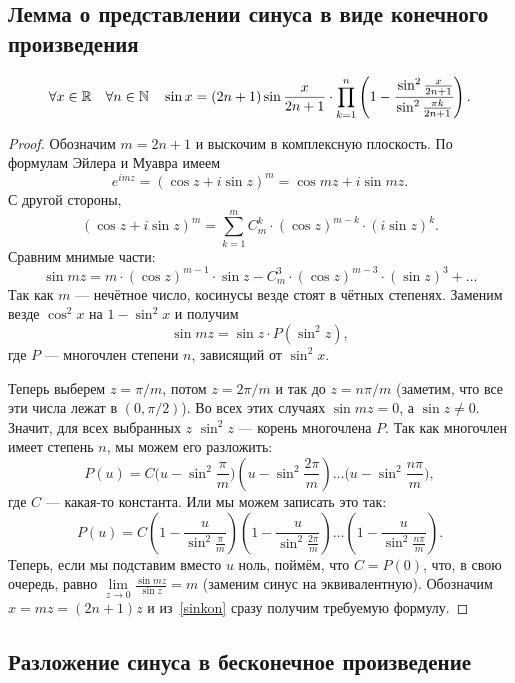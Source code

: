 \subsection{Лемма о представлении синуса в виде конечного произведения}

\begin{lemma} \hypertarget{sinlem}{}
	\[
		\forall x \in \mathbb{R} \quad \forall n \in \mathbb{N} \quad \sin x = (2n + 1) \sin \frac{x}{2n + 1} \cdot \prod_{k=1}^{n} \left(1 - \cfrac{\sin^2 \frac{x}{2n + 1}}{\sin^2 \frac{\pi k}{2n + 1}} \right).
	\]
\end{lemma}
\begin{proof}
	Обозначим \(m = 2n + 1\) и выскочим в комплексную плоскость. По формулам Эйлера и Муавра имеем \[
	e^{i m z} = (\cos z + i \sin z)^m = \cos mz + i \sin mz.
	\]
	С другой стороны, \[
	(\cos z + i \sin z)^m = \sum_{k=1}^{m} C_m^k \cdot (\cos z)^{m-k} \cdot (i \sin z)^k.
	\]
	Сравним мнимые части: \[
	\sin mz = m \cdot (\cos z)^{m-1} \cdot \sin z - C_m^3 \cdot (\cos z)^{m-3} \cdot (\sin z)^3 + \ldots
	\]
	Так как \(m\) --- нечётное число, косинусы везде стоят в чётных степенях. Заменим везде \(\cos^2 x\) на \(1 - \sin^2 x\) и получим
	\begin{equation} \label{sinkon}
		\sin mz = \sin z \cdot P(\sin^2 z),
	\end{equation}
	где \(P\) --- многочлен степени \(n\), зависящий от \(\sin^2 x\).
	
	Теперь выберем \(z = \pi/m\), потом \(z = 2\pi/m\) и так до \(z = n\pi/m\) (заметим, что все эти числа лежат в \((0, \pi/2)\)). Во всех этих случаях \(\sin mz = 0\), а \(\sin z \neq 0\). Значит, для всех выбранных \(z\) \(\sin^2 z\) --- корень многочлена \(P\). Так как многочлен имеет степень \(n\), мы можем его разложить: \[
	P(u) = C \bigg(u - \sin^2 \frac{\pi}{m} \bigg) \left(u - \sin^2 \frac{2 \pi}{m} \right) \ldots \bigg(u - \sin^2 \frac{n \pi}{m} \bigg),
	\]
	где \(C\) --- какая-то константа. Или мы можем записать это так: \[
	P(u) = C \left(1 - \frac{u}{\sin^2 \frac{\pi}{m}} \right) \left(1 - \frac{u}{\sin^2 \frac{2 \pi}{m}} \right) \ldots  \left(1 - \frac{u}{\sin^2 \frac{n \pi}{m}} \right).
	\]
	Теперь, если мы подставим вместо \(u\) ноль, поймём, что \(C = P(0)\), что, в свою очередь, равно \(\lim\limits_{z \to 0} \frac{\sin mz}{\sin z} = m\) (заменим синус на эквивалентную). Обозначим \(x = mz = (2n + 1) z\) и из~\eqref{sinkon} сразу получим требуемую формулу.
\end{proof}

\subsection{Разложение синуса в бесконечное произведение}

